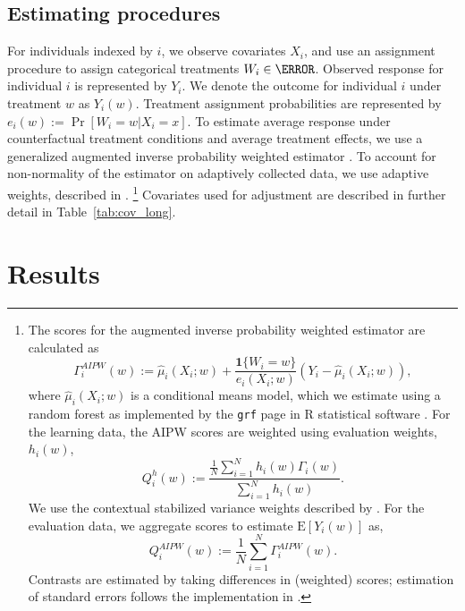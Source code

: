 \documentclass[letterpaper, 12pt, parskip=full,DIV=10]{scrartcl}
\begin{document}
\subsection{Estimating procedures}\label{section:estimation}
For individuals indexed by $i$, we observe covariates $X_i$, and use an assignment procedure to assign categorical treatments $W_i \in \W$. Observed response for individual $i$ is represented by $Y_i$. We denote the outcome for individual $i$ under treatment $w$ as $Y_i(w)$. Treatment assignment probabilities are represented by $e_i(w):=\Pr[W_i=w\rvert X_i=x]$. To estimate average response under counterfactual treatment conditions and average treatment effects, we use a generalized augmented inverse probability weighted estimator \citep{robins1994estimation}. To account for non-normality of the estimator on adaptively collected data, we use adaptive weights, described in \cite{zhan2021off}.%
\footnote{
The scores for the augmented inverse probability weighted estimator are calculated as
\begin{equation}
\Gamma^{AIPW}_i(w) := \hat \mu_i (X_i; w) + \frac{\textbf{1}\{W_i = w\}}{e_i(X_i;w)}\left(Y_i - \hat\mu_i(X_i;w) \right),
\end{equation}
where $\hat \mu_i (X_i; w)$ is a conditional means model, which we estimate using a random forest as implemented by the \texttt{grf} page in R statistical software \citep{Tibshirani:2020aa}. 
For the learning data, the AIPW scores are weighted using evaluation weights, $h_i(w)$,
\begin{equation}
Q_i^{h}(w) := \frac{ \frac{1}{N}\sum_{i = 1}^N h_i(w)\Gamma_i(w)}{\sum_{i = 1}^N h_i(w)} . 
\label{eq:scores_learning}
\end{equation}
We use the contextual stabilized variance weights described by \cite{zhan2021off}. 
For the evaluation data, we aggregate scores to estimate $\textrm{E}[Y_i(w)]$ as,
\begin{equation}
Q_i^{AIPW}(w) := \frac{1}{N}\sum_{i = 1}^N \Gamma^{AIPW}_i(w). 
\end{equation}
Contrasts are estimated by taking differences in (weighted) scores; estimation of standard errors follows the implementation in \cite{Tibshirani:2020aa}.%
}
Covariates used for adjustment are described in further detail in Table~\ref{tab:cov_long}. 




\section{Results}
\end{document}
